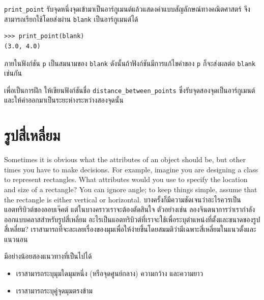 \verb"print_point" รับจุดหนึ่งจุดเข้ามาเป็นอาร์กูเมนต์แล้วแสดงค่าแบบสัญลักษณ์ทางคณิตศาสตร์ จึงสามารถเรียกใช้โดยส่งผ่าน {\tt blank} เป็นอาร์กูเมนต์ได้

\begin{verbatim}
>>> print_point(blank)
(3.0, 4.0)
\end{verbatim}
%

ภายในฟังก์ชัน {\tt p} เป็นสมนามของ {\tt blank} ดังนั้นถ้าฟังก์ชันมีการแก้ไขค่าของ {\tt p} ก็จะส่งผลต่อ {\tt blank} เช่นกัน


เพื่อเป็นการฝึก ให้เขียนฟังก์ชันชื่อ  \verb"distance_between_points" ซึ่งรับจุดสองจุดเป็นอาร์กูเมนต์และให้ค่าออกมาเป็นระยะห่างระหว่างสองจุดนั้น

\section{รูปสี่เหลี่ยม} %
\label{rectangles}

Sometimes it is obvious what the attributes of an object should be,
but other times you have to make decisions.  For example, imagine you
are designing a class to represent rectangles.  What attributes would
you use to specify the location and size of a rectangle?  You can
ignore angle; to keep things simple, assume that the rectangle is
either vertical or horizontal.
บางครั้งก็มีความชัดเจนว่าอะไรควรเป็นแอตทริบิวต์ของออบเจ๊คต์ แต่ในบางคราวเราจะต้องตัดสินใจ ตัวอย่างเช่น 
ลองจินตนาการว่าเรากำลังออกแบบคลาสสำหรับรูปสี่เหลี่ยม อะไรเป็นแอตทริบิวต์ที่เราจะใช้เพื่อระบุตำแหน่งที่ตั้งและขนาดของรูปสี่เหลี่ยม? 
เราสามารถที่จะละเลยเรื่องของมุมเพื่อให้ง่ายขึ้นโดยสมมติว่ามีเฉพาะสี่เหลี่ยมในแนวตั้งและแนวนอน



มีอย่างน้อยสองแนวทางที่เป็นไปได้

\begin{itemize}

\item เราสามารถระบุมุมใดมุมหนึ่ง (หรือจุดศูนย์กลาง) ความกว้าง และความยาว

\item เราสามารถระบุคู่จุดมุมตรงข้าม

\end{itemize}

